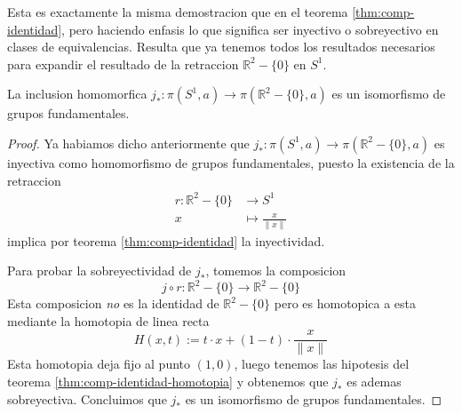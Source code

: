 Esta es exactamente la misma demostracion que en el teorema
\ref{thm:comp-identidad}, pero haciendo enfasis lo que significa ser
inyectivo o sobreyectivo en clases de equivalencias. Resulta que ya
tenemos todos los resultados necesarios para expandir el resultado de la
retraccion \(\mathbb R ^2 - \{0\}\) en \(S^1\).

\begin{teorema}
  La inclusion homomorfica \(j_* : \pi (S^1, a) \to \pi (\mathbb R ^2 -
  \{0\}, a)\) es un isomorfismo de grupos fundamentales.
\end{teorema}
\begin{proof}
  Ya habiamos dicho anteriormente que \( j_* : \pi (S^1, a) \to \pi
  (\mathbb R ^2 - \{0\}, a)\) es inyectiva como homomorfismo de grupos
  fundamentales, puesto la existencia de la retraccion
  \begin{align*}
    r : \mathbb R ^2 - \{0\} &\to S^1 \\
    x &\mapsto \frac x {\lVert x \rVert}
  \end{align*}
  implica por teorema \ref{thm:comp-identidad} la inyectividad.

  Para probar la sobreyectividad de \(j_*\), tomemos la composicion
  \[ j \circ r : \mathbb R ^2 - \{0\} \to \mathbb R ^2 - \{0\} \]
  Esta composicion \emph{no} es la identidad de \(\mathbb R ^2 - \{0\}
  \) pero es homotopica a esta mediante la homotopia de linea recta
  \[ H(x,t) := t \cdot x + (1 - t) \cdot \frac x {\lVert x \rVert} \]
  Esta homotopia deja fijo al punto \((1,0)\), luego tenemos las
  hipotesis del teorema \ref{thm:comp-identidad-homotopia} y obtenemos
  que \(j_*\) es ademas sobreyectiva. Concluimos que \(j_*\) es un
  isomorfismo de grupos fundamentales.
\end{proof}


